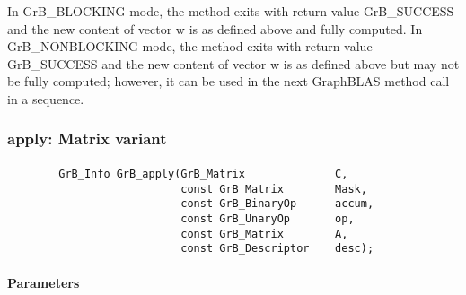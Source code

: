In {\sf GrB\_BLOCKING} mode, the method exits with return value 
{\sf GrB\_SUCCESS} and the new content of vector {\sf w} is as defined above
and fully computed.  
In {\sf GrB\_NONBLOCKING} mode, the method exits with return value 
{\sf GrB\_SUCCESS} and the new content of vector {\sf w} is as defined above 
but may not be fully computed; however, it can be used in the next GraphBLAS 
method call in a sequence.


\subsubsection{{\sf apply}: Matrix variant}

\paragraph{\syntax}

\begin{verbatim}
        GrB_Info GrB_apply(GrB_Matrix              C,
                           const GrB_Matrix        Mask,
                           const GrB_BinaryOp      accum,
                           const GrB_UnaryOp       op,
                           const GrB_Matrix        A,
                           const GrB_Descriptor    desc);
\end{verbatim}

\paragraph{Parameters}

